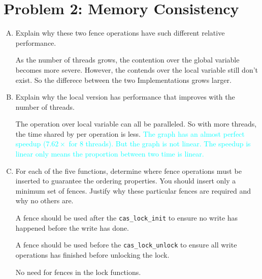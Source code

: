 \documentclass[11pt]{article}
\newenvironment{choice}{\begin{enumerate}[A.]}{\end{enumerate}}
\newenvironment{answer}{\begin{minipage}[c][2in]{\textwidth}}{\end{minipage}}
\begin{document}
\section*{Problem 2: Memory Consistency}

\begin{choice}
\item Explain why these two fence operations have such different
relative  performance.

\begin{answer}

As the number of threads grows, the contention over the global variable becomes more severe. 
However, the contends over the local variable still don't exist. So the differece between the 
two Implementations grows larger. 

\end{answer}

\item
Explain why the local version has performance that improves with the
number of threads.

\begin{answer}

The operation over local variable can all be paralleled. So with more threads, the time shared
by per operation is less. 
\textcolor{cyan}{The graph has an almost perfect speedup ($7.62\times$ for 8 threads). But the 
graph is not linear. The speedup is linear only means the proportion between two time is linear. }

\end{answer}

\item
For each of the five functions, determine where fence operations must be inserted
to guarantee the ordering properties.  You should insert only a
minimum set of fences.  Justify why these particular fences are
required and why no others are.

\begin{answer}
A fence should be used after the \lstinline{cas_lock_init} to ensure no write has happened 
before the write has done. 

A fence should be used before the \lstinline{cas_lock_unlock} to ensure all write operations
has finished before unlocking the lock. 

No need for fences in the lock functions. 
\end{answer}
\end{choice}
\end{document}
